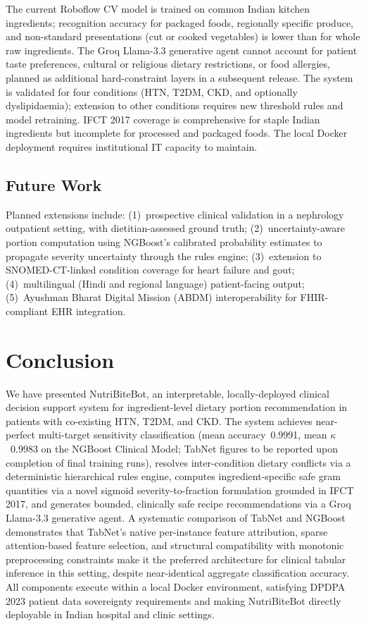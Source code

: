 \documentclass[journal]{IEEEtran}
\begin{document}
The current Roboflow CV model is trained on common Indian kitchen
ingredients; recognition accuracy for packaged foods, regionally
specific produce, and non-standard presentations (cut or cooked
vegetables) is lower than for whole raw ingredients. The Groq Llama-3.3
generative agent cannot account for patient taste preferences, cultural
or religious dietary restrictions, or food allergies, planned as
additional hard-constraint layers in a subsequent release. The system
is validated for four conditions (HTN, T2DM, CKD, and optionally
dyslipidaemia); extension to other conditions requires new threshold
rules and model retraining. IFCT 2017 coverage is comprehensive for
staple Indian ingredients but incomplete for processed and packaged
foods. The local Docker deployment requires institutional IT capacity to
maintain.

\subsection{Future Work}

Planned extensions include: (1)~prospective clinical validation in a
nephrology outpatient setting, with dietitian-assessed ground truth;
(2)~uncertainty-aware portion computation using NGBoost's calibrated
probability estimates to propagate severity uncertainty through the rules
engine; (3)~extension to SNOMED-CT-linked condition coverage for
heart failure and gout; (4)~multilingual (Hindi and regional language)
patient-facing output; (5)~Ayushman Bharat Digital Mission (ABDM)
interoperability for FHIR-compliant EHR integration.

\section{Conclusion}
\label{sec:conclusion}

We have presented NutriBiteBot, an interpretable, locally-deployed
clinical decision support system for ingredient-level dietary portion
recommendation in patients with co-existing HTN, T2DM, and CKD.
The system achieves near-perfect multi-target sensitivity classification
(mean accuracy~0.9991, mean $\kappa$~0.9983 on the NGBoost Clinical
Model; TabNet figures to be reported upon completion of final training
runs), resolves inter-condition dietary conflicts via a deterministic
hierarchical rules engine, computes ingredient-specific safe gram
quantities via a novel sigmoid severity-to-fraction formulation grounded
in IFCT 2017, and generates bounded, clinically safe recipe
recommendations via a Groq Llama-3.3 generative agent. A systematic
comparison of TabNet and NGBoost demonstrates that TabNet's native
per-instance feature attribution, sparse attention-based feature
selection, and structural compatibility with monotonic preprocessing
constraints make it the preferred architecture for clinical tabular
inference in this setting, despite near-identical aggregate
classification accuracy. All components execute within a local Docker
environment, satisfying DPDPA 2023 patient data sovereignty requirements
and making NutriBiteBot directly deployable in Indian hospital and clinic
settings.
\end{document}
